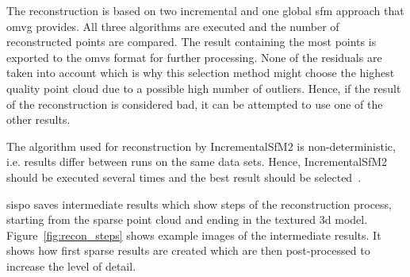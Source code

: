 The reconstruction is based on two incremental and one global \gls{sfm} approach that \gls{omvg} provides. All three algorithms are executed and the number of reconstructed points are compared. The result containing the most points is exported to the \gls{omvs} format for further processing. None of the residuals are taken into account which is why this selection method might choose the highest quality point cloud due to a possible high number of outliers. Hence, if the result of the reconstruction is considered bad, it can be attempted to use one of the other results.

The algorithm used for reconstruction by IncrementalSfM2 is non-deterministic, i.e. results differ between runs on the same data sets. Hence, IncrementalSfM2 should be executed several times and the best result should be selected~\cite{Pajusalu2019CharacterizationMapping}.

\Gls{sispo} saves intermediate results which show steps of the reconstruction process, starting from the sparse point cloud and ending in the textured \gls{3d} model. Figure~\ref{fig:recon_steps} shows example images of the intermediate results. It shows how first sparse results are created which are then post-processed to increase the level of detail.


